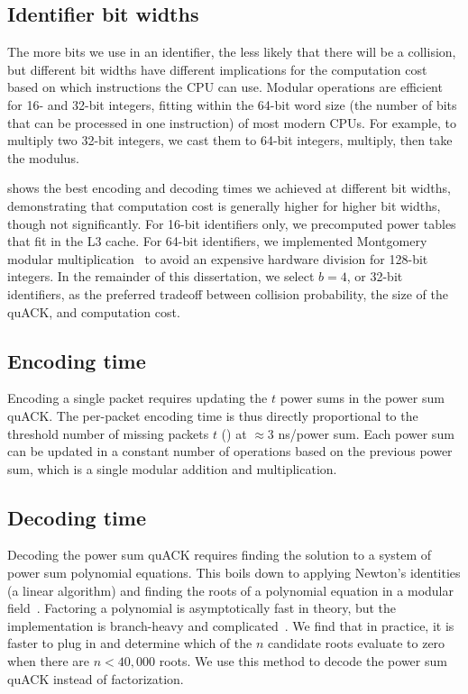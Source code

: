 \subsection{Identifier bit widths}
\label{sec:quack:psum-microbenchmarks:bit-widths}

The more bits we use in an identifier, the less likely that there will be a
collision, but different bit widths have different implications for the
computation cost based on which instructions the CPU can use. Modular operations are efficient
for 16- and 32-bit integers, fitting within the 64-bit word size (the number of
bits that can be processed in one instruction) of most modern CPUs. For example,
to multiply two 32-bit integers, we cast them to 64-bit integers, multiply,
then take the modulus.

 shows the best encoding and decoding times we achieved
at different bit widths, demonstrating that computation cost is generally
higher for higher bit widths, though not significantly. For 16-bit identifiers
only, we precomputed power tables that fit in the L3 cache. For 64-bit
identifiers, we implemented Montgomery modular multiplication~\cite{montgomery1985modular}
to avoid an expensive hardware division for 128-bit
integers. In the remainder of this dissertation, we select $b=4$, or 32-bit
identifiers, as the preferred tradeoff between collision probability, the size
of the quACK, and computation cost.

\subsection{Encoding time}
\label{sec:quack:psum-microbenchmarks:encoding}

Encoding a single packet requires updating the $t$ power sums in the power sum
quACK.
The per-packet encoding time is thus directly proportional to
the threshold number of missing packets $t$ () at
$\approx 3$ ns/power sum.
Each power sum can be updated in a constant number of operations based on the
previous power sum, which is a single modular addition and multiplication.

\subsection{Decoding time}
\label{sec:quack:psum-microbenchmarks:decoding}

Decoding the power sum quACK requires finding the solution to a system of power
sum polynomial equations. This boils down to applying Newton's identities (a
linear algorithm) and finding the roots of a polynomial equation in a modular
field~\cite{eppstein2011straggler}.
Factoring a polynomial is asymptotically fast in theory, but the implementation
is branch-heavy and complicated~\cite{batut2000user}.
We find that in practice, it is faster to plug in and determine which of the
$n$ candidate roots evaluate to zero when there are $n < 40,000$ roots.
We use this method to decode the power sum quACK instead of factorization.

